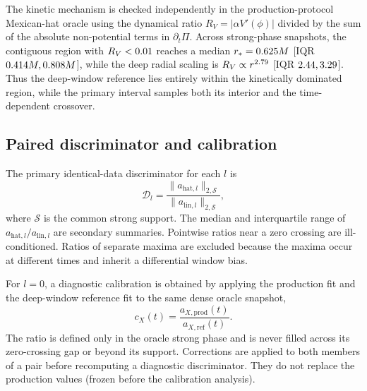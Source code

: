 \documentclass[
  aps,
  prd,
  reprint,
  superscriptaddress,
  nofootinbib,
  longbibliography
]{revtex4-2}
\newcommand{\ahat}[1]{a_{\mathrm{hat},#1}}
\newcommand{\alin}[1]{a_{\mathrm{lin},#1}}
\begin{document}
The kinetic mechanism is checked independently in the production-protocol
Mexican-hat oracle using the dynamical ratio $R_V=|\alpha V'(\phi)|$ divided
by the sum of the absolute non-potential terms in $\partial_t\Pi$.
Across strong-phase snapshots, the contiguous region with
$R_V<0.01$ reaches a median
$r_*=0.625 M$ [IQR
$0.414 M,0.808 M$], while the deep radial
scaling is $R_V\propto r^{2.79}$ [IQR
$2.44,3.29$].  Thus the deep-window
reference lies entirely within the kinetically dominated region, while the
primary interval samples both its interior and the time-dependent crossover.

\subsection{Paired discriminator and calibration}

The primary identical-data discriminator for each $l$ is
\begin{equation}
  \mathcal{D}_l
  =\frac{\lVert \ahat{l}\rVert_{2,\mathcal{S}}}
  {\lVert \alin{l}\rVert_{2,\mathcal{S}}},
  \label{eq:discriminator}
\end{equation}
where $\mathcal{S}$ is the common strong support.  The median and interquartile
range of $\ahat{l}/\alin{l}$ are secondary summaries.  Pointwise ratios near a
zero crossing are ill-conditioned.  Ratios of separate maxima are excluded
because the maxima occur at different times and inherit a differential
window bias.

For $l=0$, a diagnostic calibration is obtained by applying the production
fit and the deep-window reference fit to the same dense oracle snapshot,
\begin{equation}
  c_X(t)=\frac{a_{X,\mathrm{prod}}(t)}{a_{X,\mathrm{ref}}(t)}.
  \label{eq:calibration}
\end{equation}
The ratio is defined only in the oracle strong phase and is never filled
across its zero-crossing gap or beyond its support.  Corrections are applied
to both members of a pair before recomputing a diagnostic discriminator.
They do not replace the production values (frozen before the calibration
analysis).
\end{document}
